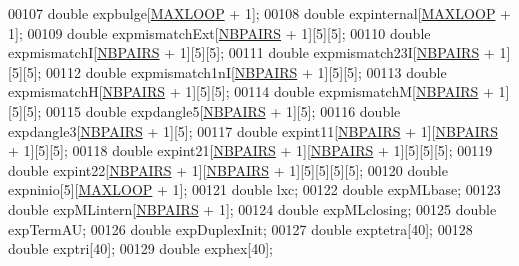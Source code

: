 \begin{DoxyCode}
00107   \textcolor{keywordtype}{double}  expbulge[\hyperlink{constants_8h_ad1bd6eabac419670ddd3c9ed82145988}{MAXLOOP} + 1];
00108   \textcolor{keywordtype}{double}  expinternal[\hyperlink{constants_8h_ad1bd6eabac419670ddd3c9ed82145988}{MAXLOOP} + 1];
00109   \textcolor{keywordtype}{double}  expmismatchExt[\hyperlink{constants_8h_a5e75221c779d618eab81e096f37e32ce}{NBPAIRS} + 1][5][5];
00110   \textcolor{keywordtype}{double}  expmismatchI[\hyperlink{constants_8h_a5e75221c779d618eab81e096f37e32ce}{NBPAIRS} + 1][5][5];
00111   \textcolor{keywordtype}{double}  expmismatch23I[\hyperlink{constants_8h_a5e75221c779d618eab81e096f37e32ce}{NBPAIRS} + 1][5][5];
00112   \textcolor{keywordtype}{double}  expmismatch1nI[\hyperlink{constants_8h_a5e75221c779d618eab81e096f37e32ce}{NBPAIRS} + 1][5][5];
00113   \textcolor{keywordtype}{double}  expmismatchH[\hyperlink{constants_8h_a5e75221c779d618eab81e096f37e32ce}{NBPAIRS} + 1][5][5];
00114   \textcolor{keywordtype}{double}  expmismatchM[\hyperlink{constants_8h_a5e75221c779d618eab81e096f37e32ce}{NBPAIRS} + 1][5][5];
00115   \textcolor{keywordtype}{double}  expdangle5[\hyperlink{constants_8h_a5e75221c779d618eab81e096f37e32ce}{NBPAIRS} + 1][5];
00116   \textcolor{keywordtype}{double}  expdangle3[\hyperlink{constants_8h_a5e75221c779d618eab81e096f37e32ce}{NBPAIRS} + 1][5];
00117   \textcolor{keywordtype}{double}  expint11[\hyperlink{constants_8h_a5e75221c779d618eab81e096f37e32ce}{NBPAIRS} + 1][\hyperlink{constants_8h_a5e75221c779d618eab81e096f37e32ce}{NBPAIRS} + 1][5][5];
00118   \textcolor{keywordtype}{double}  expint21[\hyperlink{constants_8h_a5e75221c779d618eab81e096f37e32ce}{NBPAIRS} + 1][\hyperlink{constants_8h_a5e75221c779d618eab81e096f37e32ce}{NBPAIRS} + 1][5][5][5];
00119   \textcolor{keywordtype}{double}  expint22[\hyperlink{constants_8h_a5e75221c779d618eab81e096f37e32ce}{NBPAIRS} + 1][\hyperlink{constants_8h_a5e75221c779d618eab81e096f37e32ce}{NBPAIRS} + 1][5][5][5][5];
00120   \textcolor{keywordtype}{double}  expninio[5][\hyperlink{constants_8h_ad1bd6eabac419670ddd3c9ed82145988}{MAXLOOP} + 1];
00121   \textcolor{keywordtype}{double}  lxc;
00122   \textcolor{keywordtype}{double}  expMLbase;
00123   \textcolor{keywordtype}{double}  expMLintern[\hyperlink{constants_8h_a5e75221c779d618eab81e096f37e32ce}{NBPAIRS} + 1];
00124   \textcolor{keywordtype}{double}  expMLclosing;
00125   \textcolor{keywordtype}{double}  expTermAU;
00126   \textcolor{keywordtype}{double}  expDuplexInit;
00127   \textcolor{keywordtype}{double}  exptetra[40];
00128   \textcolor{keywordtype}{double}  exptri[40];
00129   \textcolor{keywordtype}{double}  exphex[40];

\end{DoxyCode}
